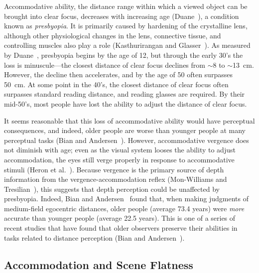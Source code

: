 \documentclass[10pt,journal,compsoc]{IEEEtran}
\makeatletter
\newcommand{\etal}{et al.\@\xspace} %
\makeatother
\begin{document}
Accommodative ability, the distance range within which a viewed object can be brought into clear focus, decreases with increasing age (Duane~\cite{duane:1912}), a condition known as \emph{presbyopia}.  It is primarily caused by hardening of the crystalline lens, although other physiological changes in the lens, connective tissue, and controlling muscles also play a role (Kasthurirangan and Glasser~\cite{kasthurirangan:2006}).  As measured by Duane~\cite{duane:1912}, presbyopia begins by the age of 12, but through the early 30's the loss is minuscule---the closest distance of clear focus declines from $\sim$8 to $\sim$13~cm.  However, the decline then accelerates, and by the age of 50 often surpasses 50~cm.  At some point in the 40's, the closest distance of clear focus often surpasses standard reading distance, and reading glasses are required.  By their mid-50's, most people have lost the ability to adjust the distance of clear focus.  

It seems reasonable that this loss of accommodative ability would have perceptual consequences, and indeed, older people are worse than younger people at many perceptual tasks (Bian and Andersen~\cite{bian:2013}).  However, accommodative vergence does not diminish with age; even as the visual system looses the ability to adjust accommodation, the eyes still verge properly in response to accommodative stimuli (Heron \etal~\cite{heron:2001}).
Because vergence is the primary source of depth information from the vergence-accommodation reflex (Mon-Williams and Tresilian~\cite{monwilliams:2000}), this suggests that depth perception could be unaffected by presbyopia.  Indeed, Bian and Andersen~\cite{bian:2013} found that, when making judgments of medium-field egocentric distances, older people (average 73.4 years) were \emph{more} accurate than younger people (average 22.5 years).  This is one of a series of recent studies that have found that older observers preserve their abilities in tasks related to distance perception (Bian and Andersen~\cite{bian:2013}). 

\subsection{Accommodation and Scene Flatness}
\end{document}
